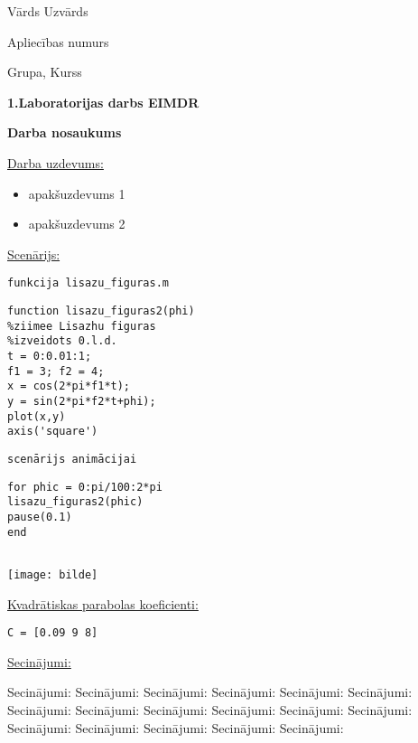 \documentclass[a4paper,11pt]{article}
\begin{document}
\begin{flushright}
Vārds
Uzvārds

Apliecības numurs

Grupa,
Kurss
\end{flushright}
\begin{center}
\begin{Large}
\textbf{1.Laboratorijas darbs  EIMDR}
\end{Large}

\begin{large}
\textbf{Darba nosaukums}
\end{large}
\end{center}
\begin{description}

\item \underline{Darba uzdevums:}
\begin{itemize}
\item apakšuzdevums 1

\item apakšuzdevums 2

\end{itemize}

\underline{Scenārijs:}





\begin{minipage}[c]{0.5\linewidth} 
\begin{Large}\verb=funkcija lisazu_figuras.m=\end{Large}

\begin{verbatim}
function lisazu_figuras2(phi)
%ziimee Lisazhu figuras
%izveidots 0.l.d.
t = 0:0.01:1;
f1 = 3; f2 = 4;
x = cos(2*pi*f1*t);
y = sin(2*pi*f2*t+phi);
plot(x,y)
axis('square')
\end{verbatim} 

\begin{Large}\verb=scenārijs animācijai=\end{Large}

\begin{verbatim}
for phic = 0:pi/100:2*pi
lisazu_figuras2(phic)
pause(0.1)
end


\end{verbatim}
\end{minipage}
\begin{minipage}[c]{0.5\linewidth}
\centering
\texttt{[image: bilde]}


\end{minipage}



\item \underline{Kvadrātiskas parabolas koeficienti:}
\begin{verbatim}
C = [0.09 9 8]
\end{verbatim}

\item\underline{Secinājumi:}

Secinājumi:
Secinājumi:
Secinājumi:
Secinājumi:
Secinājumi:
Secinājumi:
Secinājumi:
Secinājumi:
Secinājumi:
Secinājumi:
Secinājumi:
Secinājumi:
Secinājumi:
Secinājumi:
Secinājumi:
Secinājumi:
Secinājumi:
\end{description}
\end{document}
